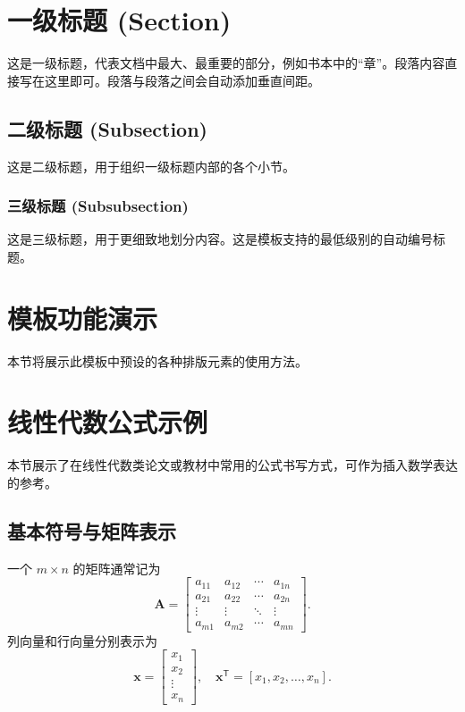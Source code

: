 \documentclass[10pt, a4paper]{article}
\begin{document}
\ucascover

\tableofcontents
\newpage


\section{一级标题 (Section)}
这是一级标题，代表文档中最大、最重要的部分，例如书本中的“章”。段落内容直接写在这里即可。段落与段落之间会自动添加垂直间距。

\subsection{二级标题 (Subsection)}
这是二级标题，用于组织一级标题内部的各个小节。

\subsubsection{三级标题 (Subsubsection)}
这是三级标题，用于更细致地划分内容。这是模板支持的最低级别的自动编号标题。

\section{模板功能演示}
本节将展示此模板中预设的各种排版元素的使用方法。

\section{线性代数公式示例}
本节展示了在线性代数类论文或教材中常用的公式书写方式，可作为插入数学表达的参考。

\subsection{基本符号与矩阵表示}
一个 $m\times n$ 的矩阵通常记为
\[
\mathbf{A} = 
\begin{bmatrix}
a_{11} & a_{12} & \cdots & a_{1n} \\
a_{21} & a_{22} & \cdots & a_{2n} \\
\vdots & \vdots & \ddots & \vdots \\
a_{m1} & a_{m2} & \cdots & a_{mn}
\end{bmatrix}.
\]
列向量和行向量分别表示为
\[
\mathbf{x} = 
\begin{bmatrix}
x_1 \\ x_2 \\ \vdots \\ x_n
\end{bmatrix},
\quad
\mathbf{x}^\mathsf{T} = [x_1, x_2, \dots, x_n].
\]
\end{document}
